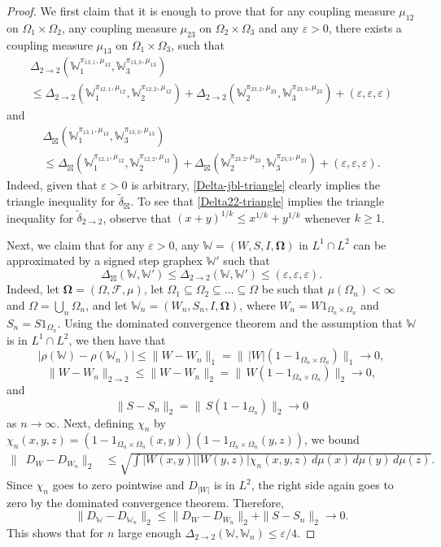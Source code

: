 \documentclass{amsart}
\numberwithin{equation}{section}
\numberwithin{figure}{section}
\theoremstyle{definition}
\theoremstyle{remark}
\newcommand{\jbl}{{\boxtimes}}
\newcommand{\eps}{\varepsilon}
\newcommand{\bOmega}{{\mathbf{\Omega}}}
\newcommand{\cW}{\mathbb{W}}
\newcommand{\cF}{\mathcal{F}}
\def\tdel22{{\widetilde{\delta}}_{2\to 2}}
\def\tdeljbl{\widetilde\delta_{\jbl}}
\begin{document}
\begin{proof}
We first claim that it is enough to prove that for any coupling measure
$\mu_{12}$ on $\Omega_1 \times \Omega_2$, any coupling measure $\mu_{23}$ on
$\Omega_2 \times \Omega_3$ and any $\varepsilon>0$, there exists a coupling
measure $\mu_{13}$ on $\Omega_1 \times \Omega_3$, such that
\begin{multline}
\label{Delta22-triangle}
\Delta_{2\to 2}(\cW_1^{\pi_{13,1},\mu_{13}},\cW_3^{\pi_{13,3},\mu_{13}})\\
\le
\Delta_{2\to 2}(\cW_1^{\pi_{12,1},\mu_{12}},\cW_2^{\pi_{12,2},\mu_{12}})
+\Delta_{2\to 2}(\cW_2^{\pi_{23,2},\mu_{23}},\cW_3^{\pi_{23,3},\mu_{23}})
+(\varepsilon,\varepsilon,\varepsilon)
\end{multline}
and
\begin{multline}
\label{Delta-jbl-triangle}
\Delta_{\jbl}(\cW_1^{\pi_{13,1},\mu_{13}},\cW_3^{\pi_{13,3},\mu_{13}})\\
\le
\Delta_{\jbl}(\cW_1^{\pi_{12,1},\mu_{12}},\cW_2^{\pi_{12,2},\mu_{12}})
+\Delta_{\jbl}(\cW_2^{\pi_{23,2},\mu_{23}},\cW_3^{\pi_{23,3},\mu_{23}})
+(\varepsilon,\varepsilon,\varepsilon).
\end{multline}
Indeed, given that $\eps>0$ is arbitrary, \eqref{Delta-jbl-triangle} clearly
implies the triangle inequality for $\tdeljbl$. To see that
\eqref{Delta22-triangle} implies the triangle inequality for $\tdel22$,
observe that $(x+y)^{1/k} \le x^{1/k}+y^{1/k}$ whenever $k \ge 1$.

Next, we claim that for any $\varepsilon>0$, any $\cW=(W,S,I,\bOmega)$ in
$L^1\cap L^2$ can be approximated by a signed step graphex $\cW'$ such that
\[
\Delta_{\jbl}(\cW,\cW') \le \Delta_{2\to 2}(\cW,\cW') \le (\varepsilon,\varepsilon,\varepsilon).
\]
Indeed, let $\bOmega=(\Omega,\cF,\mu)$, let
$\Omega_1\subseteq\Omega_2\subseteq\dots\subseteq\Omega$ be such that
$\mu(\Omega_n)<\infty$ and $\Omega=\bigcup_n\Omega_n$, and let
$\cW_n=(W_n,S_n,I,\bOmega)$, where $W_n=W1_{\Omega_n\times\Omega_n}$ and
$S_n=S1_{\Omega_n}$. Using the dominated convergence theorem and the
assumption that $\cW$ is in $L^1\cap L^2$, we then have that
\[
\left|\rho(\cW)-\rho(\cW_n)\right|\leq \|W-W_n\|_1
=\|\,|W|(1-1_{\Omega_n\times\Omega_n})\|_1\to 0,
\]
\[
\|W-W_n\|_{2\to 2}\leq \|W-W_n\|_2=\|\,W(1-1_{\Omega_n\times\Omega_n})\|_2\to 0,
\]
and
\[
\|S-S_n\|_2=\|\,S(1-1_{\Omega_n})\|_2\to 0
\]
as $n\to\infty$. Next, defining $\chi_n$ by
$\chi_n(x,y,z)=(1-1_{\Omega_n\times\Omega_n}(x,y))
(1-1_{\Omega_n\times\Omega_n}(y,z))$, we bound
\begin{align*}
\|&D_W-D_{W_n}\|_2
&\leq\sqrt{\int|W(x,y)||W(y,z)| \chi_n(x,y,z) \,d\mu(x)\,d\mu(y) \,d\mu(z)}.
\end{align*}
Since $\chi_n$ goes to zero pointwise and $D_{|W|}$ is in $L^2$, the right
side again goes to zero by the dominated convergence theorem. Therefore,
\[\|D_{\cW}-D_{\cW_n}\|_2 \le \|D_W-D_{W_n}\|_2+\|S-S_n\|_2 \to 0
.\] This shows that for $n$ large enough $\Delta_{2\to 2}(\cW,\cW_{n})\leq
\eps /4$.


\end{proof}
\end{document}
